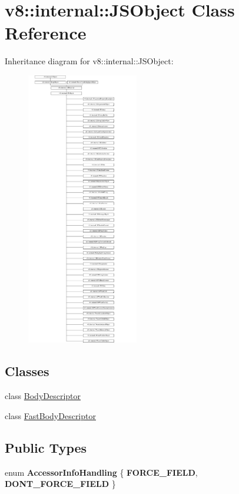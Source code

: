 \hypertarget{classv8_1_1internal_1_1JSObject}{}\section{v8\+:\+:internal\+:\+:J\+S\+Object Class Reference}
\label{classv8_1_1internal_1_1JSObject}
Inheritance diagram for v8\+:\+:internal\+:\+:J\+S\+Object\+:\begin{figure}[H]
\begin{center}
\leavevmode
\includegraphics[height=12.000000cm]{classv8_1_1internal_1_1JSObject}
\end{center}
\end{figure}
\subsection*{Classes}
\begin{DoxyCompactItemize}
\item 
class \mbox{\hyperlink{classv8_1_1internal_1_1JSObject_1_1BodyDescriptor}{Body\+Descriptor}}
\item 
class \mbox{\hyperlink{classv8_1_1internal_1_1JSObject_1_1FastBodyDescriptor}{Fast\+Body\+Descriptor}}
\end{DoxyCompactItemize}
\subsection*{Public Types}
\begin{DoxyCompactItemize}
\item 
\mbox{\label{classv8_1_1internal_1_1JSObject_a7f0e7a7d79b2a2169ba93fa1da932a69}} 
enum {\bfseries Accessor\+Info\+Handling} \{ {\bfseries F\+O\+R\+C\+E\+\_\+\+F\+I\+E\+LD}, 
{\bfseries D\+O\+N\+T\+\_\+\+F\+O\+R\+C\+E\+\_\+\+F\+I\+E\+LD}
 \}
\end{DoxyCompactItemize}
